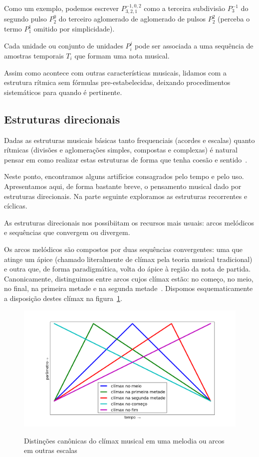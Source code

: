 Como um exemplo, podemos escrever $P^{-1,0,2}_{3,2,1}$  como a terceira subdivisão $P^{-1}_3$ do segundo
pulso $P^0_2$ do terceiro aglomerado de aglomerado de pulsos $P^2_2$ (perceba o termo $P^1_1$ omitido por simplicidade).

Cada unidade ou conjunto de unidades $P_i^j$ pode ser associada a uma sequência de amostras temporais $T_i$ que formam uma nota musical. 

Assim como acontece com outras características
musicais, lidamos com a estrutura rítmica sem fórmulas pre-estabelecidas, deixando procedimentos sistemáticos para quando é pertinente.


\subsection{Estruturas direcionais}

Dadas as estruturas musicais básicas tanto frequenciais (acordes e escalas) quanto 
rítmicas (divisões e aglomerações simples, compostas e complexas) é 
natural pensar em como realizar estas estruturas de forma que tenha coesão e sentido~\cite{Boulez}.

Neste ponto, encontramos alguns artifícios consagrados pelo tempo e pelo uso. 
Apresentamos aqui, de forma bastante breve, o pensamento musical dado por estruturas direcionais.
Na parte seguinte exploramos as estruturas recorrentes e cíclicas.

As estruturas direcionais nos possibiitam os recursos mais usuais: arcos melódicos e sequências que convergem ou divergem.

Os arcos melódicos são compostos por duas sequências convergentes: 
uma que atinge um ápice (chamado literalmente de clímax pela teoria musical tradicional) e 
outra que, de forma paradigmática, volta do ápice à região da nota de partida. Canonicamente, distinguimos entre arcos cujos clímax estão: no começo, no meio, no final, na primeira metade e na segunda metade~\cite{Schoenberg}. Dispomos esquematicamente a disposição destes clímax na figura~\ref{fig:climax}.

\begin{figure}[h!]
    \centering
    \caption{Distinções canônicas do clímax musical em uma melodia ou arcos em outras escalas}
        \includegraphics[width=\textwidth]{figuras/climax}
        \label{fig:climax}
\end{figure}


